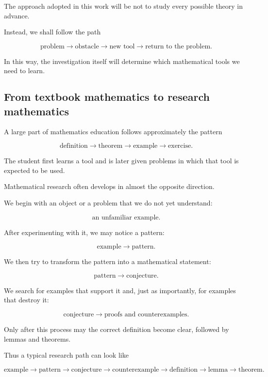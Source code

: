 The approach adopted in this work will be not to study every possible
theory in advance.

Instead, we shall follow the path

\[
\boxed{
\text{problem}
\longrightarrow
\text{obstacle}
\longrightarrow
\text{new tool}
\longrightarrow
\text{return to the problem}.
}
\]

In this way, the investigation itself will determine which mathematical
tools we need to learn.

\subsection{From textbook mathematics to research mathematics}

A large part of mathematics education follows approximately the pattern

\[
\text{definition}
\longrightarrow
\text{theorem}
\longrightarrow
\text{example}
\longrightarrow
\text{exercise}.
\]

The student first learns a tool and is later given problems in which that
tool is expected to be used.

Mathematical research often develops in almost the opposite direction.

We begin with an object or a problem that we do not yet understand:

\[
\text{an unfamiliar example}.
\]

After experimenting with it, we may notice a pattern:

\[
\text{example}
\longrightarrow
\text{pattern}.
\]

We then try to transform the pattern into a mathematical statement:

\[
\text{pattern}
\longrightarrow
\text{conjecture}.
\]

We search for examples that support it and, just as importantly, for
examples that destroy it:

\[
\text{conjecture}
\longrightarrow
\text{proofs and counterexamples}.
\]

Only after this process may the correct definition become clear, followed
by lemmas and theorems.

Thus a typical research path can look like

\[
\boxed{
\text{example}
\to
\text{pattern}
\to
\text{conjecture}
\to
\text{counterexample}
\to
\text{definition}
\to
\text{lemma}
\to
\text{theorem}.
}
\]

